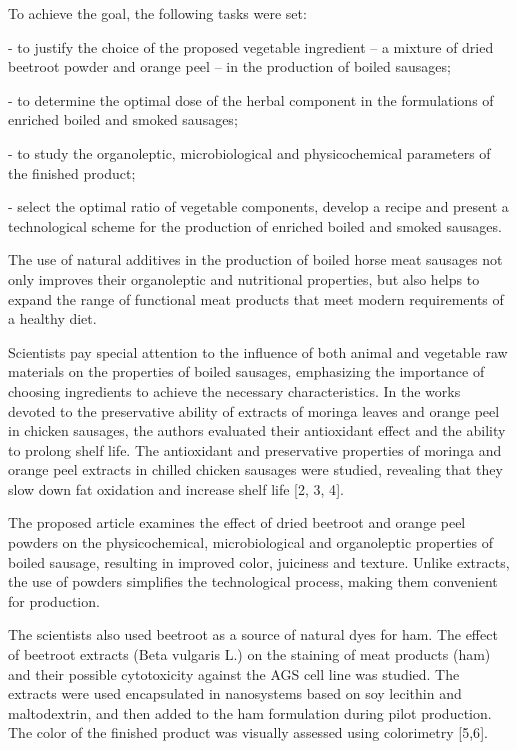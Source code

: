\begin{multicols}{2}
To achieve the goal, the following tasks were set:

- to justify the choice of the proposed vegetable ingredient -- a
mixture of dried beetroot powder and orange peel -- in the production of
boiled sausages;

- to determine the optimal dose of the herbal component in the
formulations of enriched boiled and smoked sausages;

- to study the organoleptic, microbiological and physicochemical
parameters of the finished product;

- select the optimal ratio of vegetable components, develop a recipe and
present a technological scheme for the production of enriched boiled and
smoked sausages.

The use of natural additives in the production of boiled horse meat
sausages not only improves their organoleptic and nutritional
properties, but also helps to expand the range of functional meat
products that meet modern requirements of a healthy diet.

Scientists pay special attention to the influence of both animal and
vegetable raw materials on the properties of boiled sausages,
emphasizing the importance of choosing ingredients to achieve the
necessary characteristics. In the works devoted to the preservative
ability of extracts of moringa leaves and orange peel in chicken
sausages, the authors evaluated their antioxidant effect and the ability
to prolong shelf life. The antioxidant and preservative properties of
moringa and orange peel extracts in chilled chicken sausages were
studied, revealing that they slow down fat oxidation and increase shelf
life {[}2, 3, 4{]}.

The proposed article examines the effect of dried beetroot and orange
peel powders on the physicochemical, microbiological and organoleptic
properties of boiled sausage, resulting in improved color, juiciness and
texture. Unlike extracts, the use of powders simplifies the
technological process, making them convenient for production.

The scientists also used beetroot as a source of natural dyes for ham.
The effect of beetroot extracts (Beta vulgaris L.) on the staining of
meat products (ham) and their possible cytotoxicity against the AGS cell
line was studied. The extracts were used encapsulated in nanosystems
based on soy lecithin and maltodextrin, and then added to the ham
formulation during pilot production. The color of the finished product
was visually assessed using colorimetry {[}5,6{]}.


\end{multicols}
